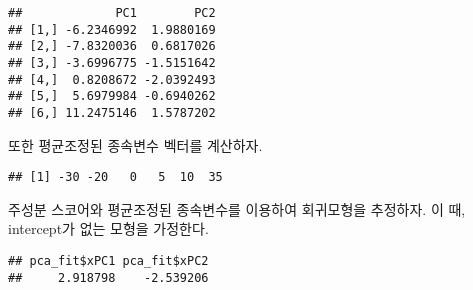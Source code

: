 \documentclass[
]{book}
\newenvironment{Shaded}{\begin{snugshade}}{\end{snugshade}}
\newcommand{\AttributeTok}[1]{\textcolor[rgb]{0.77,0.63,0.00}{#1}}
\newcommand{\ConstantTok}[1]{\textcolor[rgb]{0.00,0.00,0.00}{#1}}
\newcommand{\DecValTok}[1]{\textcolor[rgb]{0.00,0.00,0.81}{#1}}
\newcommand{\FunctionTok}[1]{\textcolor[rgb]{0.00,0.00,0.00}{#1}}
\newcommand{\NormalTok}[1]{#1}
\newcommand{\OtherTok}[1]{\textcolor[rgb]{0.56,0.35,0.01}{#1}}
\newcommand{\SpecialCharTok}[1]{\textcolor[rgb]{0.00,0.00,0.00}{#1}}
\newcommand{\StringTok}[1]{\textcolor[rgb]{0.31,0.60,0.02}{#1}}
\begin{document}
\begin{Shaded}
\end{Shaded}

\begin{verbatim}
##             PC1        PC2
## [1,] -6.2346992  1.9880169
## [2,] -7.8320036  0.6817026
## [3,] -3.6996775 -1.5151642
## [4,]  0.8208672 -2.0392493
## [5,]  5.6979984 -0.6940262
## [6,] 11.2475146  1.5787202
\end{verbatim}

또한 평균조정된 종속변수 벡터를 계산하자.

\begin{Shaded}
\end{Shaded}

\begin{verbatim}
## [1] -30 -20   0   5  10  35
\end{verbatim}

주성분 스코어와 평균조정된 종속변수를 이용하여 회귀모형을 추정하자. 이 때, intercept가 없는 모형을 가정한다.

\begin{Shaded}
\end{Shaded}

\begin{verbatim}
## pca_fit$xPC1 pca_fit$xPC2 
##     2.918798    -2.539206
\end{verbatim}
\end{document}
